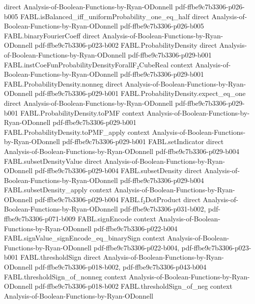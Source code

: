 \begin{theorem}
  {direct}
  {Analysis-of-Boolean-Functions-by-Ryan-ODonnell}
  {pdf-ffbe9c7b3306-p026-b005}
\proofstep
  {FABL.isBalanced_iff_uniformProbability_one_eq_half}
  {direct}
  {Analysis-of-Boolean-Functions-by-Ryan-ODonnell}
  {pdf-ffbe9c7b3306-p026-b005}
\proofstep
  {FABL.binaryFourierCoeff}
  {direct}
  {Analysis-of-Boolean-Functions-by-Ryan-ODonnell}
  {pdf-ffbe9c7b3306-p023-b002}
\proofstep
  {FABL.ProbabilityDensity}
  {direct}
  {Analysis-of-Boolean-Functions-by-Ryan-ODonnell}
  {pdf-ffbe9c7b3306-p029-b001}
\proofstep
  {FABL.instCoeFunProbabilityDensityForallF₂CubeReal}
  {context}
  {Analysis-of-Boolean-Functions-by-Ryan-ODonnell}
  {pdf-ffbe9c7b3306-p029-b001}
\proofstep
  {FABL.ProbabilityDensity.nonneg}
  {direct}
  {Analysis-of-Boolean-Functions-by-Ryan-ODonnell}
  {pdf-ffbe9c7b3306-p029-b001}
\proofstep
  {FABL.ProbabilityDensity.expect_eq_one}
  {direct}
  {Analysis-of-Boolean-Functions-by-Ryan-ODonnell}
  {pdf-ffbe9c7b3306-p029-b001}
\proofstep
  {FABL.ProbabilityDensity.toPMF}
  {context}
  {Analysis-of-Boolean-Functions-by-Ryan-ODonnell}
  {pdf-ffbe9c7b3306-p029-b001}
\proofstep
  {FABL.ProbabilityDensity.toPMF_apply}
  {context}
  {Analysis-of-Boolean-Functions-by-Ryan-ODonnell}
  {pdf-ffbe9c7b3306-p029-b001}
\proofstep
  {FABL.setIndicator}
  {direct}
  {Analysis-of-Boolean-Functions-by-Ryan-ODonnell}
  {pdf-ffbe9c7b3306-p029-b004}
\proofstep
  {FABL.subsetDensityValue}
  {direct}
  {Analysis-of-Boolean-Functions-by-Ryan-ODonnell}
  {pdf-ffbe9c7b3306-p029-b004}
\proofstep
  {FABL.subsetDensity}
  {direct}
  {Analysis-of-Boolean-Functions-by-Ryan-ODonnell}
  {pdf-ffbe9c7b3306-p029-b004}
\proofstep
  {FABL.subsetDensity_apply}
  {context}
  {Analysis-of-Boolean-Functions-by-Ryan-ODonnell}
  {pdf-ffbe9c7b3306-p029-b004}
\proofstep
  {FABL.f₂DotProduct}
  {direct}
  {Analysis-of-Boolean-Functions-by-Ryan-ODonnell}
  {pdf-ffbe9c7b3306-p031-b002,
    pdf-ffbe9c7b3306-p071-b009}
\proofstep
  {FABL.signEncode}
  {context}
  {Analysis-of-Boolean-Functions-by-Ryan-ODonnell}
  {pdf-ffbe9c7b3306-p022-b004}
\proofstep
  {FABL.signValue_signEncode_eq_binarySign}
  {context}
  {Analysis-of-Boolean-Functions-by-Ryan-ODonnell}
  {pdf-ffbe9c7b3306-p022-b004,
    pdf-ffbe9c7b3306-p023-b001}
\proofstep
  {FABL.thresholdSign}
  {direct}
  {Analysis-of-Boolean-Functions-by-Ryan-ODonnell}
  {pdf-ffbe9c7b3306-p018-b002,
    pdf-ffbe9c7b3306-p043-b004}
\proofstep
  {FABL.thresholdSign_of_nonneg}
  {context}
  {Analysis-of-Boolean-Functions-by-Ryan-ODonnell}
  {pdf-ffbe9c7b3306-p018-b002}
\proofstep
  {FABL.thresholdSign_of_neg}
  {context}
  {Analysis-of-Boolean-Functions-by-Ryan-ODonnell}

\end{theorem}
